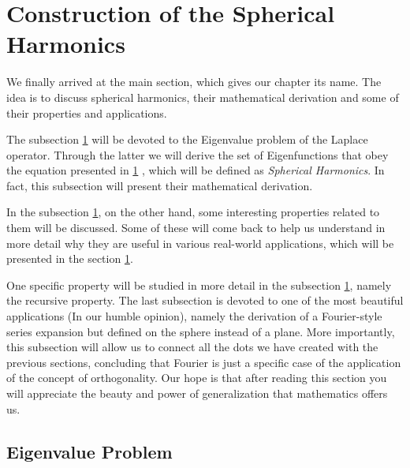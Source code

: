 
\section{Construction of the Spherical Harmonics}


We finally arrived at the main section, which gives our chapter its name. The
idea is to discuss spherical harmonics, their mathematical derivation and some
of their properties and applications.

The subsection \ref{}  will be devoted to the
Eigenvalue problem of the Laplace operator. Through the latter we will derive
the set of Eigenfunctions that obey the equation presented in \ref{}
, which will be defined as
\emph{Spherical Harmonics}. In fact, this subsection will present their
mathematical derivation.

In the subsection \ref{}, on the other hand, some interesting properties
related to them will be discussed. Some of these will come back to help us
understand in more detail why they are useful in various real-world
applications, which will be presented in the section \ref{}.

One specific property will be studied in more detail in the subsection \ref{},
namely the recursive property.  The last subsection is devoted to one of the
most beautiful applications (In our humble opinion), namely the derivation of a
Fourier-style series expansion but defined on the sphere instead of a plane.
More importantly, this subsection will allow us to connect all the dots we have
created with the previous sections, concluding that Fourier is just a specific
case of the application of the concept of orthogonality. Our hope is that after
reading this section you will appreciate the beauty and power of generalization
that mathematics offers us.

\subsection{Eigenvalue Problem}
\label{kugel:sec:construction:eigenvalue}

